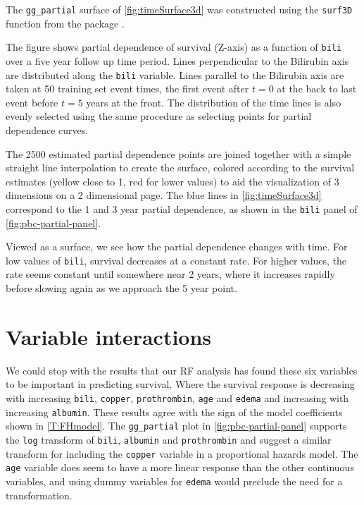 \documentclass[article, nojss]{jss}
\begin{document}
The \texttt{gg\_partial} surface of \autoref{fig:timeSurface3d} was
constructed using the \texttt{surf3D} function from the 
package
\citep[\url{http://CRAN.R-project.org/package=plot3D}]{plot3D:2014}.

The figure shows partial dependence of survival (Z-axis) as a function
of \texttt{bili} over a five year follow up time period. Lines
perpendicular to the Bilirubin axis are distributed along the
\texttt{bili} variable. Lines parallel to the Bilirubin axis are taken
at 50 training set event times, the first event after \(t=0\) at the
back to last event before \(t=5\) years at the front. The distribution
of the time lines is also evenly selected using the same procedure as
selecting points for partial dependence curves.

The 2500 estimated partial dependence points are joined together with a
simple straight line interpolation to create the surface, colored
according to the survival estimates (yellow close to 1, red for lower
values) to aid the visualization of 3 dimensions on a 2 dimensional
page. The blue lines in \autoref{fig:timeSurface3d} correspond to the 1
and 3 year partial dependence, as shown in the \texttt{bili} panel of
\autoref{fig:pbc-partial-panel}.

Viewed as a surface, we see how the partial dependence changes with
time. For low values of \texttt{bili}, survival decreases at a constant
rate. For higher values, the rate seems constant until somewhere near 2
years, where it increases rapidly before slowing again as we approach
the 5 year point.

\section{Variable interactions}\label{variable-interactions}

We could stop with the results that our RF analysis has found these six
variables to be important in predicting survival. Where the survival
response is decreasing with increasing \texttt{bili}, \texttt{copper},
\texttt{prothrombin}, \texttt{age} and \texttt{edema} and increasing
with increasing \texttt{albumin}. These results agree with the sign of
the \cite{fleming:1991} model coefficients shown in \autoref{T:FHmodel}.
The \texttt{gg\_partial} plot in \autoref{fig:pbc-partial-panel}
supports the \texttt{log} transform of \texttt{bili}, \texttt{albumin}
and \texttt{prothrombin} and suggest a similar transform for including
the \texttt{copper} variable in a proportional hazards model. The
\texttt{age} variable does seem to have a more linear response than the
other continuous variables, and using dummy variables for \texttt{edema}
would preclude the need for a transformation.
\end{document}
